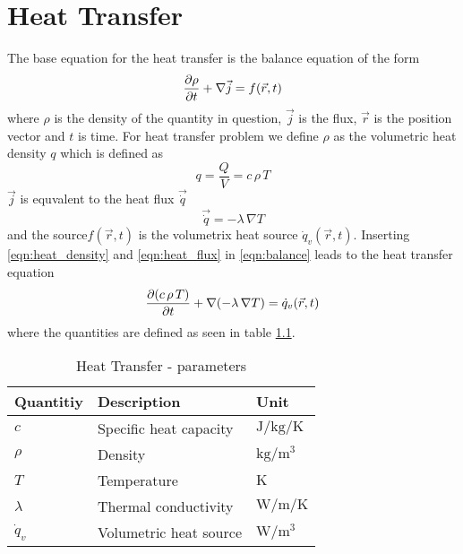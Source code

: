 \chapter{Heat Transfer}
The base equation for the heat transfer is the balance equation of the form
\begin{equation}
\label{eqn:balance}
    \pdv{\rho}{t} + \nabla \vec{j} = f(\vec{r}, t)
\end{equation}
where $\rho$ is the density of the quantity in question, $\vec{j}$ is the flux, $\vec{r}$ is the position vector and $t$ is time.
For heat transfer problem we define $\rho$ as the volumetric heat density $q$ which is defined as
\begin{equation}
\label{eqn:heat_density}
    q = \frac{Q}{V} = c \, \rho \, T
\end{equation}
$\vec{j}$ is equvalent to the heat flux $\vec{\dot{q}}$
\begin{equation}
\label{eqn:heat_flux}
    \vec{\dot{q}} = -\lambda \, \nabla T
\end{equation}
and the source$f(\vec{r}, t)$ is the volumetrix heat source $\dot{q}_v(\vec{r}, t)$.
Inserting \ref{eqn:heat_density} and \ref{eqn:heat_flux} in \ref{eqn:balance} leads to the heat transfer equation
\begin{equation}
\label{eqn:heat_transfer}
    \pdv{(c \, \rho \, T)}{t} + \nabla (-\lambda \, \nabla T ) = \dot{q}_v(\vec{r}, t)
\end{equation}
where the quantities are defined as seen in table \ref{tab:parameters}.
\begin{table}[ht]
\centering
\caption{Heat Transfer - parameters}
\label{tab:parameters}
\begin{tabular}{lll}
\hline
\hline
Quantitiy & Description & Unit\\
\hline
$c$ & Specific heat capacity & $\si{\joule\per\kilogram\per\kelvin}$\\
$\rho$ & Density & $\si{\kilogram\per\meter\cubed}$\\
$T$ & Temperature & $\si{\kelvin}$\\
$\lambda$ & Thermal conductivity & $\si{\watt\per\meter\per\kelvin}$\\
$\dot{q}_v$ & Volumetric heat source & $\si{\watt\per\meter\cubed}$\\
\hline
\hline
\end{tabular}
\end{table}


